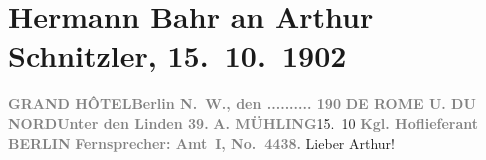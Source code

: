 

         
         \renewcommand{\erwaehntePersonen}{Personen: Alfred Halm, Adolph Mühling, Karl Strecker, Hermann Sudermann}
         \renewcommand{\erwaehnteOrte}{Orte: Berlin, Hotel de Rome, Unter den Linden}
         \renewcommand{\erwaehnteWerke}{Werke: Berliner Theater. Hermann Bahr: »Wienerinnen«. (Eine nicht einwandfreie Kritik), Tägliche Rundschau, Wienerinnen. Lustspiel in drei Akten}
               \section[Hermann Bahr an Arthur Schnitzler, 15. 10. 1902]{ Hermann Bahr an Arthur Schnitzler, 15. 10. 1902}\nopagebreak{}\rehead{ }\begin{ledgroupsized}[t]{13cm}\normalsize\beginnumbering \toendnotes[C]{\smallbreak\pagebreak[2]} 
\toendnotes[C]{\smallbreak}\pstart
           \noindent{}{\pb}\textcolor{gray}{\textbf{GRAND HÔTEL}}\hfill \textcolor{gray}{\textbf{Berlin N. W., den .......... 190}}\pend
           \pstart
           \textcolor{gray}{\textbf{DE ROME U. DU NORD}}\hfill \textcolor{gray}{\textbf{Unter den Linden 39.}}\pend
           \pstart
           \textcolor{gray}{\textbf{A. MÜHLING}}\hfill 15. 10\pend
           \pstart
           \textcolor{gray}{\textbf{Kgl. Hoflieferant}}\pend
           \pstart
           \textcolor{gray}{\textbf{BERLIN}}\pend
           \pstart
           \textcolor{gray}{\textbf{Fernsprecher: Amt I, No. 4438.}}\pend
           \pstart\center{}Lieber Arthur!\pend\pstart

\end{ledgroupsized}
